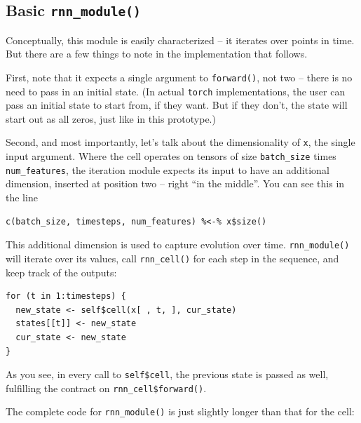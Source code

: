 \documentclass[
  letterpaper,
]{krantz}
\begin{document}
\hypertarget{basic-rnn_module}{%
\subsection{\texorpdfstring{Basic
\texttt{rnn\_module()}}{Basic rnn\_module()}}\label{basic-rnn_module}}

Conceptually, this module is easily characterized -- it iterates over
points in time. But there are a few things to note in the implementation
that follows.

First, note that it expects a single argument to \texttt{forward()}, not
two -- there is no need to pass in an initial state. (In actual
\texttt{torch} implementations, the user can pass an initial state to
start from, if they want. But if they don't, the state will start out as
all zeros, just like in this prototype.)

Second, and most importantly, let's talk about the dimensionality of
\texttt{x}, the single input argument. Where the cell operates on
tensors of size \texttt{batch\_size} times \texttt{num\_features}, the
iteration module expects its input to have an additional dimension,
inserted at position two -- right ``in the middle''. You can see this in
the line

\begin{verbatim}
c(batch_size, timesteps, num_features) %<-% x$size()
\end{verbatim}

This additional dimension is used to capture evolution over time.
\texttt{rnn\_module()} will iterate over its values, call
\texttt{rnn\_cell()} for each step in the sequence, and keep track of
the outputs:

\begin{verbatim}
for (t in 1:timesteps) {
  new_state <- self$cell(x[ , t, ], cur_state)
  states[[t]] <- new_state
  cur_state <- new_state
}
\end{verbatim}

As you see, in every call to \texttt{self\$cell}, the previous state is
passed as well, fulfilling the contract on
\texttt{rnn\_cell\$forward()}.

The complete code for \texttt{rnn\_module()} is just slightly longer
than that for the cell:
\end{document}
